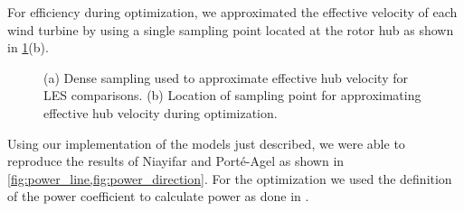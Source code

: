 \documentclass[conf]{new-aiaa}
\begin{document}
For efficiency during optimization, we approximated the effective velocity of each wind turbine by using a single sampling point located at the rotor hub
as shown in \cref{fig:sampling_locs}(b).

\begin{figure}[ht]
	\centering
	\caption{(a) Dense sampling used to approximate effective hub velocity for LES comparisons. (b) Location of sampling point for approximating effective hub velocity during optimization.}
	\label{fig:sampling_locs}
\end{figure}

Using our implementation of the models just described, we were able to reproduce the results of Niayifar and Port\'{e}-Agel \cite{niayifar2016} as shown in \cref{fig:power_line,fig:power_direction}. For the optimization we used the definition of the power coefficient to calculate power as done in \cite{gebraad2014}.
\end{document}
